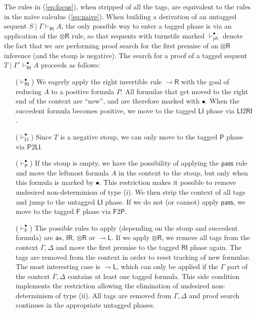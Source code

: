 \documentclass[copyright,creativecommons]{eptcs}
\theoremstyle{definition}
\newcommand{\tr}{\otimes \mathsf{R}}
\newcommand{\lright}{{\multimap}\mathsf{R}}
\newcommand{\lleft}{{\multimap}\mathsf{L}}
\newcommand{\pass}{\mathsf{pass}}
\newcommand{\unitr}{\mathsf{IR}}
\newcommand{\ax}{\mathsf{ax}}
\newcommand{\RI}{\mathsf{RI}}
\newcommand{\LI}{\mathsf{LI}}
\newcommand{\Pass}{\mathsf{P}}
\newcommand{\F}{\mathsf{F}}
\begin{document}
The rules in (\ref{eq:focus}), when stripped of all the tags, are equivalent to the rules in the na{\"i}ve calculus (\ref{eq:naive}). When building a derivation of an untagged sequent $S \mid \Gamma \vdash_\RI A$, the only possible way to enter a tagged phase is via an application of the $\tr$ rule, so that sequents with turnstile marked $\vdash_{ph}^\bullet$ denote the fact that we are performing proof search for the first premise of an $\tr$ inference (and the stoup is negative).
The search for a proof of a tagged sequent $T \mid \Gamma^\circ \vdash^\bullet_\RI A$ proceeds as follows:
\begin{itemize}
\item[($\vdash^\bullet_\RI$)] We eagerly apply the right invertible rule $\lright$ with the goal of reducing $A$ to a positive formula $P$. All formulae that get moved to the right end of the context are ``new'', and are therefore marked with $\bullet$.
  When the succedent formula becomes positive, we move to the tagged $\LI$ phase via $\LI2\RI$.
\item[($\vdash^\bullet_\LI$)] Since $T$ is a negative stoup, we can only move to the tagged $\Pass$ phase via $\Pass2\LI$.
\item[($\vdash^\bullet_\Pass$)] If the stoup is empty, we have the possibility of applying the $\pass$ rule and move the leftmost formula $A$ in the context to the stoup, but only when this formula is marked by $\bullet$. This restriction makes it possible to remove undesired non-determinism of type (i). We then strip the context of all tags and jump to the untagged $\LI$ phase. If we do not (or cannot) apply $\pass$, we move to the tagged $\F$ phase via $\F2\Pass$.
\item[($\vdash^\bullet_\F$)] The possible rules to apply (depending on the stoup and succedent formula) are $\ax$, $\unitr$, $\tr$ or $\lleft$. If we apply $\tr$, we remove all tags from the context $\Gamma, \Delta$ and move the first premise to the tagged $\RI$ phase again. The tags are removed from the context in order to reset tracking of new formulae. The most interesting case is $\lleft$, which can only be applied if the $\Gamma$ part of the context $\Gamma, \Delta$ contains at least one tagged formula. This side condition implements the restriction allowing the elimination of undesired non-determinism of type (ii). All tags are removed from $\Gamma, \Delta$ and proof search continues in the appropriate untagged phases.
\end{itemize}
\end{document}
